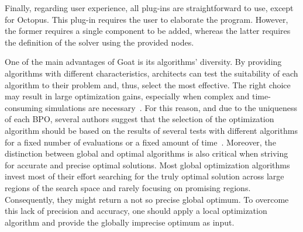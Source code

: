	Finally, regarding user experience, all plug-ins are straightforward to use, except for Octopus. This plug-in requires the user to elaborate the program. However, the former requires a single component to be added, whereas the latter requires the definition of the solver using the provided nodes.
	
	
	One of the main advantages of Goat is its algorithms' diversity. By providing algorithms with different characteristics, architects can test the suitability of each algorithm to their problem and, thus, select the most effective. The right choice may result in large optimization gains, especially when complex and time-consuming simulations are necessary~\cite{Wortmann2016BBO}. For this reason, and due to the uniqueness of each \ac{BPO}, several authors suggest that the selection of the optimization algorithm should be based on the results of several tests with different algorithms for a fixed number of evaluations or a fixed amount of time~\cite{Hamdy2016,Wortmann2016BBO}. Moreover, the distinction between global and optimal algorithms is also critical when striving for accurate and precise optimal solutions. Most global optimization algorithms invest most of their effort searching for the truly optimal solution across large regions of the search space and rarely focusing on promising regions. Consequently, they might return a not so precise global optimum. To overcome this lack of precision and accuracy, one should apply a local optimization algorithm and provide the globally imprecise optimum as input.
	
	
	
